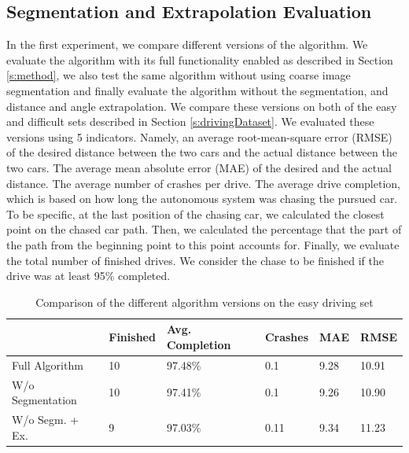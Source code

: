\documentclass{ctuthesis/ctuthesis}
\begin{document}
\subsection{Segmentation and Extrapolation Evaluation} \label{s:experiment1}
In the first experiment, we compare different versions of the algorithm. We evaluate the algorithm with its full functionality enabled as described in Section \ref{s:method}, we also test the same algorithm without using coarse image segmentation and finally evaluate the algorithm without the segmentation, and distance and angle extrapolation. We compare these versions on both of the easy and difficult sets described in Section \ref{s:drivingDataset}. We evaluated these versions using 5 indicators. Namely, an average root-mean-square error (RMSE) of the desired distance between the two cars and the actual distance between the two cars. The average mean absolute error (MAE) of the desired and the actual distance. The average number of crashes per drive. The average drive completion, which is based on how long the autonomous system was chasing the pursued car. To be specific, at the last position of the chasing car, we calculated the closest point on the chased car path. Then, we calculated the percentage that the part of the path from the beginning point to this point accounts for. Finally, we evaluate the total number of finished drives. We consider the chase to be finished if the drive was at least 95\% completed.\par

\begin{table}[]
\tabcolsep=0.11cm
\begin{tabular}{l|lllll}
\hline
                                      & Finished & Avg. Completion  & Crashes & MAE  & RMSE   \\ \hline
Full Algorithm                         & 10       & 97.48\% & 0.1     & 9.28 & 10.91 \\
W/o Segmentation                    & 10       & 97.41\%          & 0.1     & 9.26 & 10.90 \\
W/o Segm. + Ex. & 9        & 97.03\%          & 0.11    & 9.34 & 11.23 \\ \hline
\end{tabular}
\caption{Comparison of the different algorithm versions on the easy driving set}\label{t:easy_drives}
\end{table}
\end{document}
